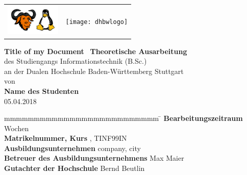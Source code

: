 \documentclass[
a4paper,   
titlepage,  
halfparskip,
12pt        
]{scrartcl}
\begin{document}
\pagestyle{fancy}
\fancyhf{} %
\fancyhead[R]{\thepage} %


\begin{titlepage}
\begin{longtable}{l|r}
{\includegraphics[height=1.5cm]{companylogo}} &
{\texttt{[image: dhbwlogo]}}
\end{longtable}
\bigskip
\bigskip
\begin{center}
\vspace*{12mm} {\LARGE\bf Title of my Document}\
\vspace*{12mm} %
\vspace*{3mm} {\large\bf Theoretische Ausarbeitung}\\
\vspace*{12mm} des Studiengangs Informationstechnik (B.Sc.)\\ an der Dualen Hochschule Baden-Württemberg Stuttgart\\
\vspace*{12mm} von\\
\vspace*{3mm} {\large\bf Name des Studenten}\\
\vspace*{12mm} 05.04.2018\\
\end{center}
\vfill
\begin{spacing}{1.5}
\begin{tabbing}
mmmmmmmmmmmmmmmmmmmmmmmmmm \= \kill
\textbf{Bearbeitungszeitraum}  Wochen\\
\textbf{Matrikelnummer, Kurs} , TINF99IN\\
\textbf{Ausbildungsunternehmen} \> company, city\\
\textbf{Betreuer des Ausbildungsunternehmens} \> Max Maier\\
\textbf{Gutachter der Hochschule} \> Bernd Beutlin\\
\end{tabbing}
\end{spacing}
\end{titlepage}
\end{document}
